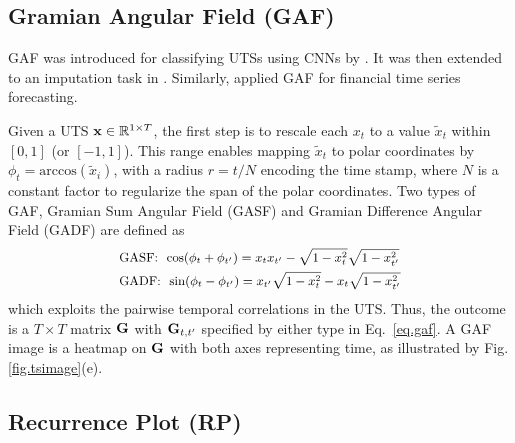 


\subsection{Gramian Angular Field (GAF)}\label{sec.gaf}

GAF was introduced for classifying UTSs using CNNs %
by \cite{wang2015encoding}. It was then extended %
to an imputation task in \cite{wang2015imaging}. Similarly, \cite{barra2020deep} applied GAF for financial time series forecasting.

Given a UTS ${\bf x}\in\mathbb{R}^{1\times T}$, %
the first step %
is to rescale each $x_{t}$ to a value $\tilde{x}_{t}$ %
within $[0, 1]$ (or $[-1, 1]$). %
This range enables mapping $\tilde{x}_{t}$ to polar coordinates by $\phi_{t}=\text{arccos}(\tilde{x}_{i})$, with a radius $r=t/N$ encoding the time stamp, where $N$ is a constant factor to regularize the span of the polar coordinates. %
Two types of GAF, Gramian Sum Angular Field (GASF) and Gramian Difference Angular Field (GADF) are defined as
\begin{equation}\label{eq.gaf}
\small
\begin{aligned}
&\text{GASF:}~~\text{cos}(\phi_{t} + \phi_{t'})=x_{t}x_{t'} - \sqrt{1 - x_{t}^{2}}\sqrt{1 - x_{t'}^{2}}\\
&\text{GADF:}~~\text{sin}(\phi_{t} - \phi_{t'})=x_{t'}\sqrt{1 - x_{t}^{2}} - x_{t}\sqrt{1 - x_{t'}^{2}}
\end{aligned}
\end{equation}
which exploits the pairwise temporal correlations in the UTS. Thus, the outcome is a $T\times T$ matrix ${\bf G}$ with ${\bf G}_{t,t'}$ specified by either type in Eq.~\eqref{eq.gaf}. A GAF image is a heatmap on ${\bf G}$ with both axes representing time, as illustrated by Fig. \ref{fig.tsimage}(e).



\subsection{Recurrence Plot (RP)}\label{sec.rp}

